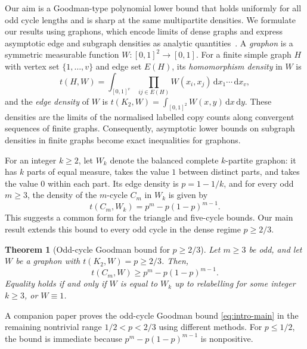 \documentclass[11pt]{article}
\newtheorem{theorem}{Theorem}[section]
\theoremstyle{remark}
\numberwithin{equation}{section}
\newcommand{\dd}{\,\mathrm d}
\newcommand{\dens}[2]{t(#1,#2)}
\newcommand{\tC}[2]{t(C_{#1},#2)}
\newcommand{\edens}[1]{t(K_{2},#1)}
\newcommand{\goodman}[2]{#1^{#2}-#1(1-#1)^{#2-1}}
\newcommand{\goal}{\goodman{p}{m}}
\newcommand{\intsq}{\int_{[0,1]^2}}
\newcommand{\intcube}[1]{\int_{[0,1]^{#1}}}
\newcommand{\ddxy}{\dd x\dd y}
\begin{document}
Our aim is a Goodman-type polynomial lower bound that holds uniformly for all odd cycle lengths and is sharp at the same multipartite densities.
We formulate our results using graphons, which encode limits of dense graphs and express asymptotic edge and subgraph densities as analytic quantities~\cite{lovasz2012large,lovasz2006limits}.
A \emph{graphon} is a symmetric measurable function $W\colon[0,1]^2\to[0,1]$.
For a finite simple graph $H$ with vertex set $\{1,\ldots,v\}$ and edge set $E(H)$, its \emph{homomorphism density} in $W$ is
\[
  \dens HW=\intcube{v}\prod_{ij\in E(H)}W(x_i,x_j)\dd x_1\cdots\dd x_v,
\]
and the \emph{edge density} of $W$ is $\edens W=\intsq W(x,y)\ddxy$.
These densities are the limits of the normalised labelled copy counts along convergent sequences of finite graphs.
Consequently, asymptotic lower bounds on subgraph densities in finite graphs become exact inequalities for graphons.

For an integer $k\ge2$, let $W_k$ denote the balanced complete $k$-partite graphon: it has $k$ parts of equal measure, takes the value $1$ between distinct parts, and takes the value $0$ within each part.
Its edge density is $p=1-1/k$, and for every odd $m\ge3$, the density of the $m$-cycle $C_m$ in $W_k$ is given by
\begin{equation}\label{eq:intro-kpartite-value}
  \tC m{W_k}=\goal.
\end{equation}
This suggests a common form for the triangle and five-cycle bounds.
Our main result extends this bound to every odd cycle in the dense regime $p\ge2/3$.
\begin{theorem}[Odd-cycle Goodman bound for $p\ge2/3$]\label{thm:main}
  Let $m\ge3$ be odd, and let $W$ be a graphon with $\edens W=p\ge2/3$.
  Then,
  \begin{equation}\label{eq:intro-main}
    \tC mW\ge\goal.
  \end{equation}
  Equality holds if and only if $W$ is equal to $W_k$ up to relabelling for some integer $k\ge3$, or $W\equiv1$.
\end{theorem}

A companion paper proves the odd-cycle Goodman bound \eqref{eq:intro-main} in the remaining nontrivial range $1/2<p<2/3$ using different methods.
For $p\le1/2$, the bound is immediate because $p^m-p(1-p)^{m-1}$ is nonpositive.
\end{document}
